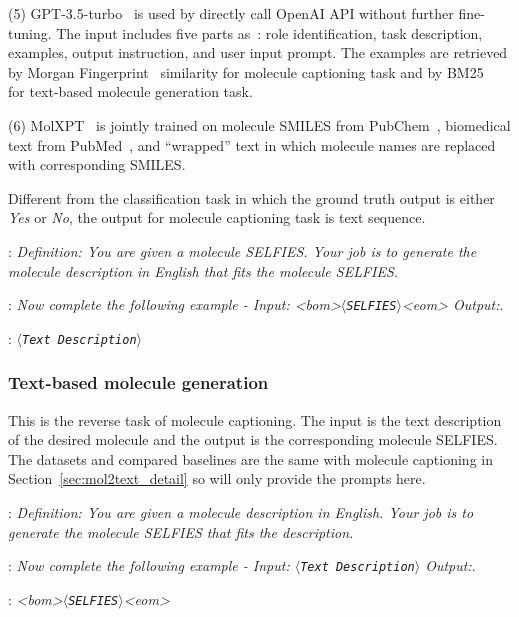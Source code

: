 \documentclass[11pt]{article}
\newcommand{\selfies}{$\langle$\texttt{SELFIES}$\rangle$}
\newcommand{\text}{$\langle$\texttt{Text Description}$\rangle$}
\begin{document}
\noindent(5) GPT-3.5-turbo~\citep{li2023empowering} is used by directly call OpenAI API without further fine-tuning. The input includes five parts as~\citet{li2023empowering}: role identification, task description, examples, output instruction, and user input prompt. The examples are retrieved by Morgan Fingerprint~\citep{DBLP:journals/jcisd/Butina99} similarity for molecule captioning task and by BM25~\citep{DBLP:journals/ftir/RobertsonZ09} for text-based molecule generation task.

\noindent(6) MolXPT~\cite{liu2023molxpt} is jointly trained on molecule SMILES from PubChem~\citep{kim2023pubchem}, biomedical text from PubMed~\citep{canese2013pubmed}, and ``wrapped'' text in which molecule names are replaced with corresponding SMILES.


\noindent Different from the classification task in which the ground truth output is either \textit{Yes} or \textit{No}, the output for molecule captioning task is text sequence.

:
\textit{Definition: You are given a molecule SELFIES. Your job is to generate the molecule description in English that fits the molecule SELFIES.}

:
\textit{Now complete the following example - Input: <bom>\selfies{}<eom> Output:}.

:
\textit{\text{}}

\subsubsection{Text-based molecule generation}
This is the reverse task of molecule captioning.
The input is the text description of the desired molecule and the output is the corresponding molecule SELFIES.
The datasets and compared baselines are the same with molecule captioning in Section~\ref{sec:mol2text_detail} so will only provide the prompts here.


:
\textit{Definition: You are given a molecule description in English. Your job is to generate the molecule SELFIES that fits the description.}

:
\textit{Now complete the following example - Input: \text{} Output:}.

:
\textit{<bom>\selfies{}<eom>}
\end{document}
